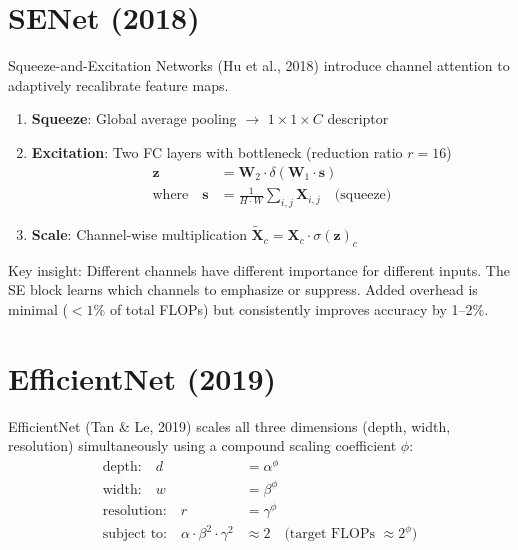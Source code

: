 \section{SENet (2018)}

Squeeze-and-Excitation Networks (Hu et al., 2018) introduce channel attention to adaptively recalibrate feature maps.

\begin{architecture}[SE Block]
\begin{enumerate}
    \item \textbf{Squeeze}: Global average pooling $\rightarrow$ $1 \times 1 \times C$ descriptor
    \item \textbf{Excitation}: Two FC layers with bottleneck (reduction ratio $r = 16$)
    \begin{align}
    \mathbf{z} &= \mathbf{W}_2 \cdot \delta(\mathbf{W}_1 \cdot \mathbf{s}) \\
    \text{where}\quad \mathbf{s} &= \frac{1}{H \cdot W}\sum_{i,j} \mathbf{X}_{i,j} \quad \text{(squeeze)}
    \end{align}
    \item \textbf{Scale}: Channel-wise multiplication $\tilde{\mathbf{X}}_c = \mathbf{X}_c \cdot \sigma(\mathbf{z})_c$
\end{enumerate}
\end{architecture}

Key insight: Different channels have different importance for different inputs. The SE block learns which channels to emphasize or suppress. Added overhead is minimal ($< 1\%$ of total FLOPs) but consistently improves accuracy by 1--2\%.

\section{EfficientNet (2019)}

EfficientNet (Tan \& Le, 2019) scales all three dimensions (depth, width, resolution) simultaneously using a compound scaling coefficient $\phi$:
\begin{align}
\text{depth:} \quad d &= \alpha^\phi \\
\text{width:} \quad w &= \beta^\phi \\
\text{resolution:} \quad r &= \gamma^\phi \\
\text{subject to:} \quad \alpha \cdot \beta^2 \cdot \gamma^2 &\approx 2 \quad \text{(target FLOPs $\approx 2^\phi$)}
\end{align}

